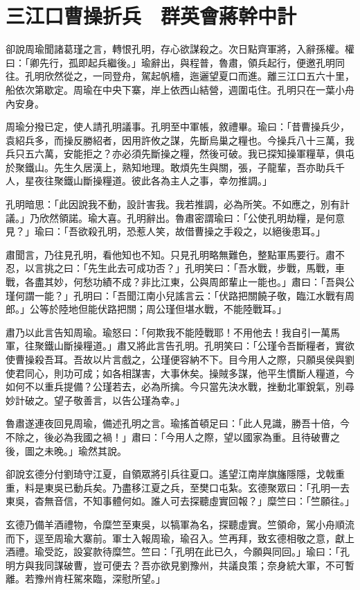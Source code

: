 
\chapter{三江口曹操折兵　群英會蔣幹中計}

卻說周瑜聞諸葛瑾之言，轉恨孔明，存心欲謀殺之。次日點齊軍將，入辭孫權。權曰：「卿先行，孤即起兵繼後。」瑜辭出，與程普，魯肅，領兵起行，便邀孔明同往。孔明欣然從之，一同登舟，駕起帆檣，迤邐望夏口而進。離三江口五六十里，船依次第歇定。周瑜在中央下寨，岸上依西山結營，週圍屯住。孔明只在一葉小舟內安身。

周瑜分撥已定，使人請孔明議事。孔明至中軍帳，敘禮畢。瑜曰：「昔曹操兵少，袁紹兵多，而操反勝紹者，因用許攸之謀，先斷烏巢之糧也。今操兵八十三萬，我兵只五六萬，安能拒之？亦必須先斷操之糧，然後可破。我已探知操軍糧草，俱屯於聚鐵山。先生久居漢上，熟知地理。敢煩先生與關，張，子龍輩，吾亦助兵千人，星夜往聚鐵山斷操糧道。彼此各為主人之事，幸勿推調。」

孔明暗思：「此因說我不動，設計害我。我若推調，必為所笑。不如應之，別有計議。」乃欣然領諾。瑜大喜。孔明辭出。魯肅密謂瑜曰：「公使孔明劫糧，是何意見？」瑜曰：「吾欲殺孔明，恐惹人笑，故借曹操之手殺之，以絕後患耳。」

肅聞言，乃往見孔明，看他知也不知。只見孔明略無難色，整點軍馬要行。肅不忍，以言挑之曰：「先生此去可成功否？」孔明笑曰：「吾水戰，步戰，馬戰，車戰，各盡其妙，何愁功績不成？非比江東，公與周郎輩止一能也。」肅曰：「吾與公瑾何謂一能？」孔明曰：「吾聞江南小兒謠言云：「伏路把關饒子敬，臨江水戰有周郎。」公等於陸地但能伏路把關；周公瑾但堪水戰，不能陸戰耳。」

肅乃以此言告知周瑜。瑜怒曰：「何欺我不能陸戰耶！不用他去！我自引一萬馬軍，往聚鐵山斷操糧道。」肅又將此言告孔明。孔明笑曰：「公瑾令吾斷糧者，實欲使曹操殺吾耳。吾故以片言戲之，公瑾便容納不下。目今用人之際，只願吳侯與劉使君同心，則功可成；如各相謀害，大事休矣。操賊多謀，他平生慣斷人糧道，今如何不以重兵提備？公瑾若去，必為所擒。今只當先決水戰，挫動北軍銳氣，別尋妙計破之。望子敬善言，以告公瑾為幸。」

魯肅遂連夜回見周瑜，備述孔明之言。瑜搖首頓足曰：「此人見識，勝吾十倍，今不除之，後必為我國之禍！」肅曰：「今用人之際，望以國家為重。且待破曹之後，圖之未晚。」瑜然其說。

卻說玄德分付劉琦守江夏，自領眾將引兵往夏口。遙望江南岸旗旛隱隱，戈戟重重，料是東吳已動兵矣。乃盡移江夏之兵，至樊口屯紮。玄德聚眾曰：「孔明一去東吳，杳無音信，不知事體何如。誰人可去探聽虛實回報？」糜竺曰：「竺願往。」

玄德乃備羊酒禮物，令糜竺至東吳，以犒軍為名，探聽虛實。竺領命，駕小舟順流而下，逕至周瑜大寨前。軍士入報周瑜，瑜召入。竺再拜，致玄德相敬之意，獻上酒禮。瑜受訖，設宴款待糜竺。竺曰：「孔明在此已久，今願與同回。」瑜曰：「孔明方與我同謀破曹，豈可便去？吾亦欲見劉豫州，共議良策；奈身統大軍，不可暫離。若豫州肯枉駕來臨，深慰所望。」

